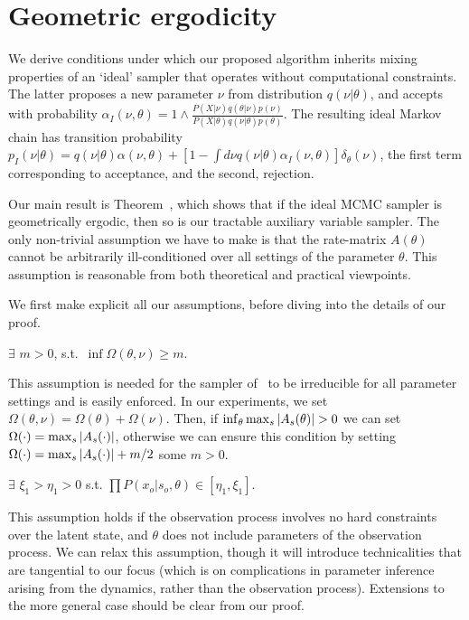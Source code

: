 \newpage
\section{Geometric ergodicity}
We derive conditions under which our proposed algorithm
inherits mixing properties of an `ideal' sampler that operates without
computational constraints. The latter proposes a new parameter $\nu$
from distribution $q(\nu|\theta)$, and accepts with probability 
$\alpha_I(\nu,\theta) = 1 \wedge \frac{P(X | \nu)q(\theta| \nu)p(\nu)}
      {P(X | \theta)q(\nu|\theta)p(\theta)}$. The resulting ideal
Markov chain has transition probability 
$p_I(\nu|\theta) = q(\nu|\theta)\alpha(\nu,\theta) + \left[1-\int d\nu
q(\nu|\theta)\alpha_I(\nu,\theta)\right]\delta_\theta(\nu)$, the first
term corresponding to acceptance, and the second, rejection.

Our main result is Theorem~\cite{}, which shows that if the ideal MCMC 
sampler is geometrically ergodic, then so is our tractable auxiliary 
variable sampler. The only non-trivial assumption we have to make is that
the rate-matrix $A(\theta)$ cannot be arbitrarily ill-conditioned over all
settings of the parameter $\theta$. This assumption is reasonable from
both theoretical and practical viewpoints.

We first make explicit all our assumptions, before diving into the details
of our proof.
\begin{assumption}
  $\exists$ $m > 0$, s.t.\ $\inf \Omega(\theta,\nu) \ge m$.
  \label{asmp:low_bnd}
\end{assumption}
\noindent 
This assumption is needed for the sampler of~\cite{RaoTeh13} to be 
irreducible for all parameter settings and is easily enforced. In our 
experiments, we set
$\Omega(\theta,\nu) = \Omega(\theta)+\Omega(\nu)$. Then, if 
$\inf_\theta {\max_s |A_s(\theta)|} > 0$ we can set $\Omega(\cdot) = {\max_s |A_s(\cdot)|}$,
otherwise we can ensure this condition by setting 
$\Omega(\cdot) = {\max_s |A_s(\cdot)|} + m/2$ some $m > 0$. 

\begin{assumption}
$\exists$ $ \xi_1 > \eta_1 > 0$ s.t. 
$\prod P(x_o | s_o, \theta) \in [\eta_1, \xi_1]$.
  \label{asmp:obs_bnd}
\end{assumption}
\noindent This assumption holds if the observation process involves no 
hard constraints over the latent state, and $\theta$ does not include
parameters of the observation process. We can relax this assumption,
though it will introduce technicalities that are tangential to our focus
(which is on complications in parameter inference arising from the 
dynamics, rather than the observation process). Extensions to the more 
general case should be clear from our proof.

